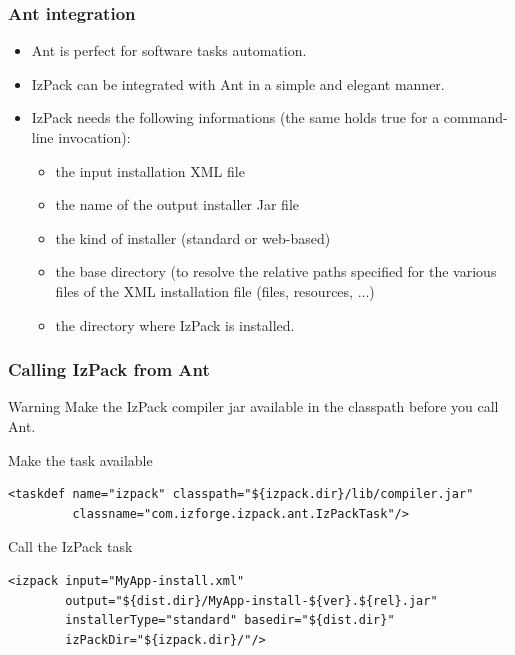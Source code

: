 \documentclass{beamer}
\begin{document}
\begin{frame}

\frametitle{Ant integration}

\begin{itemize}

  \item Ant is perfect for software tasks automation.

  \item IzPack can be integrated with Ant in a simple and elegant manner.

  \item IzPack needs the following informations (the same holds true for a
  command-line invocation):
    \begin{itemize}
      \item the input installation XML file

      \item the name of the output installer Jar file

      \item the kind of installer (standard or web-based)

      \item the base directory (to resolve the relative paths specified for the
      various files of the XML installation file (files, resources, ...)

      \item the directory where IzPack is installed.
    \end{itemize}

\end{itemize}

\end{frame}


\begin{frame}[containsverbatim]

\frametitle{Calling IzPack from Ant}

\begin{alertblock}{Warning}
Make the IzPack compiler jar available in the classpath before you call Ant.
\end{alertblock}

\begin{block}{Make the task available}
\tiny
\begin{verbatim}
<taskdef name="izpack" classpath="${izpack.dir}/lib/compiler.jar"
         classname="com.izforge.izpack.ant.IzPackTask"/>
\end{verbatim}
\end{block}

\begin{block}{Call the IzPack task}
\tiny
\begin{verbatim}
<izpack input="MyApp-install.xml"
        output="${dist.dir}/MyApp-install-${ver}.${rel}.jar"
        installerType="standard" basedir="${dist.dir}"
        izPackDir="${izpack.dir}/"/>
\end{verbatim}
\end{block}

\end{frame}
\end{document}
